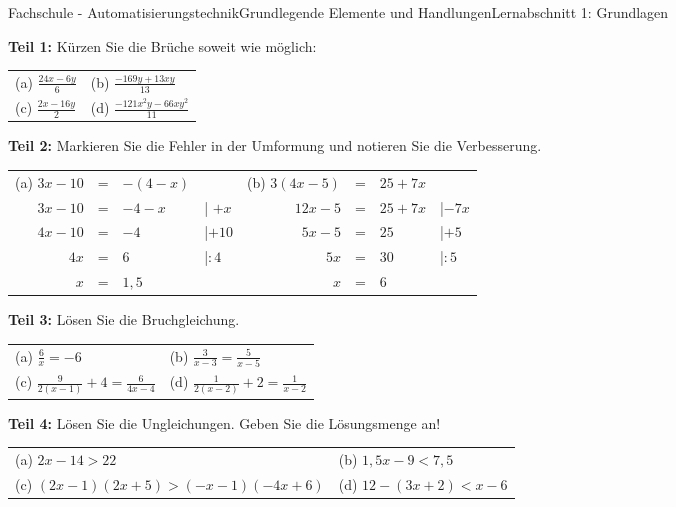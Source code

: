 \documentclass[oneside,openany,headings=optiontotoc,11pt,numbers=noenddot]{scrreprt}
\begin{document}
	\begin{worksheet}{Fachschule - Automatisierungstechnik}{Grundlegende Elemente und Handlungen}{Lernabschnitt 1: Grundlagen}
		\renewcommand{\arraystretch}{1.5}
		\begin{framed}
			\noindent
			\textbf{Teil 1:} Kürzen Sie die Brüche soweit wie möglich:\\
			\begin{tabularx}{\textwidth}{XX}
				(a) \(\frac{24x-6y}{6}\) & (b) \(\frac{-169y+13xy}{13}\)\\
				(c) \(\frac{2x-16y}{2}\) & (d) \(\frac{-121x^2y-66xy^2}{11}\)
			\end{tabularx}
		\end{framed}
		\begin{framed}
			\noindent
			\textbf{Teil 2:} Markieren Sie die Fehler in der Umformung und notieren Sie die Verbesserung.\\
			\begin{tabularx}{\textwidth}{rclX|rclX}
				(a) \(3x - 10\) & = & \(-(4-x)\) & & (b) \(3(4x-5)\) & = & \(25 + 7x\) & \\
				\(3x-10\) & = & \(-4-x\) & | \(+x\) & \(12x -5\) & = & \(25 + 7x\) & |\(-7x\)\\
				\(4x -10\) & = & \(-4\) & |\(+10\) & \(5x-5\) & = & \(25\) & |\(+5\)\\
				\(4x\) & = & \(6\) & |\(:4\) & \(5x\) & = & \(30\) & |\(:5\)\\
				\(x\) & = &\(1,5\) & & \(x\) & = & \(6\)				
			\end{tabularx}
		\end{framed}
		\begin{framed}
			\noindent
			\textbf{Teil 3:} Lösen Sie die Bruchgleichung.\\
			\begin{tabularx}{\textwidth}{XX}
				(a) \(\frac{6}{x} = -6\) & (b) \(\frac{3}{x-3} = \frac{5}{x-5}\)\\
				(c) \(\frac{9}{2(x-1)}+4 = \frac{6}{4x-4}\) & (d) \(\frac{1}{2(x-2)} + 2 = \frac{1}{x-2}\)
			\end{tabularx}
		\end{framed}
		\begin{framed}
			\noindent
			\textbf{Teil 4:} Lösen Sie die Ungleichungen. Geben Sie die Lösungsmenge an!\\
			\begin{tabularx}{\textwidth}{XX}
				(a) \(2x -14 > 22\) & (b) \(1,5x-9 < 7,5\)\\
				(c) \((2x-1)(2x+5) > (-x-1)(-4x+6)\) & (d) \(12-(3x+2) < x-6\)

\end{tabularx}
\end{framed}
\end{worksheet}
\end{document}
